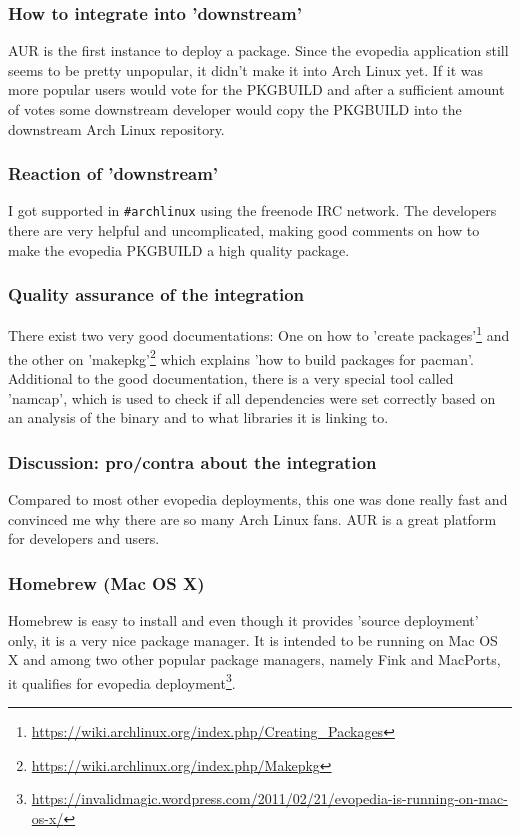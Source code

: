 \documentclass[a4paper,10pt]{article}
\begin{document}
\subsubsection*{How to integrate into 'downstream'}
AUR is the first instance to deploy a package. Since the evopedia application still seems to be pretty unpopular, it didn't make it into Arch Linux yet. If it was more popular users would vote for the PKGBUILD and after a sufficient amount of votes some downstream developer would copy the PKGBUILD into the downstream Arch Linux repository.

\subsubsection*{Reaction of 'downstream'}
I got supported in \texttt{\#archlinux} using the freenode IRC network. The developers there are very helpful and uncomplicated, making good comments on how to make the evopedia PKGBUILD a high quality package. 

\subsubsection*{Quality assurance of the integration}
There exist two very good documentations: One on how to 'create packages'\footnote{\url{https://wiki.archlinux.org/index.php/Creating_Packages}} and the other on 'makepkg'\footnote{\url{https://wiki.archlinux.org/index.php/Makepkg}} which explains 'how to build packages for pacman'. Additional to the good documentation, there is a very special tool called 'namcap', which is used to check if all dependencies were set correctly based on an analysis of the binary and to what libraries it is linking to.

\subsubsection*{Discussion: pro/contra about the integration}
Compared to most other evopedia deployments, this one was done really fast and convinced me why there are so many Arch Linux fans. AUR is a great platform for developers and users. 





\newpage
\subsubsection{Homebrew (Mac OS X)}
Homebrew is easy to install and even though it provides 'source deployment' only, it is a very nice package manager. It is intended to be running on Mac OS X and among two other popular package managers, namely Fink and MacPorts, it qualifies for evopedia deployment\footnote{\url{https://invalidmagic.wordpress.com/2011/02/21/evopedia-is-running-on-mac-os-x/}}. \\
\end{document}
